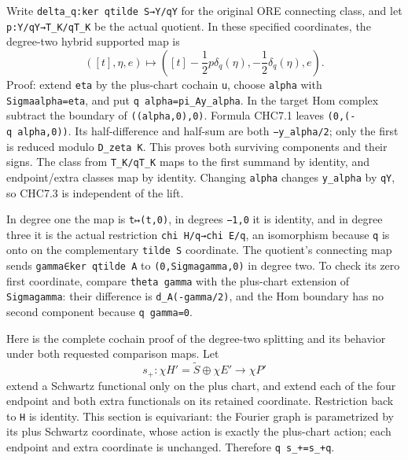 Write \texttt{delta\_q:ker\ q\textbar{}tilde\ S→Y/qY} for the original
ORE connecting class, and let \texttt{p:Y/qY→T\_K/qT\_K} be the actual
quotient. In these specified coordinates, the degree-two hybrid
supported map is \[
([t],\eta,e)\longmapsto
\left([t]-\frac12p\delta_q(\eta),
-\frac12\delta_q(\eta),e\right).
\tag{CHC7.3}
\] Proof: extend \texttt{eta} by the plus-chart cochain \texttt{u},
choose \texttt{alpha} with \texttt{Sigma\textquotesingle{}alpha=eta},
and put \texttt{q\ alpha=pi\_A\textquotesingle{}y\_alpha}. In the target
Hom complex subtract the boundary of \texttt{((alpha,0),0)}. Formula
CHC7.1 leaves \texttt{(0,(-q\ alpha,0))}. Its half-difference and
half-sum are both \texttt{−y\_alpha/2}; only the first is reduced modulo
\texttt{D\_zeta\ K}. This proves both surviving components and their
signs. The class from \texttt{T\_K/qT\_K} maps to the first summand by
identity, and endpoint/extra classes map by identity. Changing
\texttt{alpha} changes \texttt{y\_alpha} by \texttt{qY}, so CHC7.3 is
independent of the lift.

In degree one the map is \texttt{t↦(t,0)}, in degrees \texttt{−1,0} it
is identity, and in degree three it is the actual restriction
\texttt{chi\ H\textquotesingle{}/q→chi\ E\textquotesingle{}/q}, an
isomorphism because \texttt{q} is onto on the complementary
\texttt{tilde\ S} coordinate. The quotient's connecting map sends
\texttt{gamma∈ker\ q\textbar{}tilde\ A} to
\texttt{(0,Sigma\textquotesingle{}gamma,0)} in degree two. To check its
zero first coordinate, compare \texttt{theta\ gamma} with the plus-chart
extension of \texttt{Sigma\textquotesingle{}gamma}: their difference is
\texttt{d\_A\textquotesingle{}(-gamma/2)}, and the Hom boundary has no
second component because \texttt{q\ gamma=0}.

Here is the complete cochain proof of the degree-two splitting and its
behavior under both requested comparison maps. Let \[
s_+:\chi H'=\widetilde S\oplus\chi E'\longrightarrow\chi P'
\] extend a Schwartz functional only on the plus chart, and extend each
of the four endpoint and both extra functionals on its retained
coordinate. Restriction back to \texttt{H} is identity. This section is
equivariant: the Fourier graph is parametrized by its plus Schwartz
coordinate, whose action is exactly the plus-chart action; each endpoint
and extra coordinate is unchanged. Therefore \texttt{q\ s\_+=s\_+q}.

